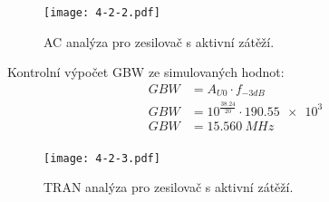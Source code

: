     \begin{figure}[h!]
        \centering
        \texttt{[image: 4-2-2.pdf]}
        \caption{AC analýza pro zesilovač s aktivní zátěží.}
        \label{fig:2-2-pdf}
    \end{figure}

    Kontrolní výpočet GBW ze simulovaných hodnot:
\begin{align*}
    GBW &= A_{U0}\cdot f_{-3dB} \\
    GBW &= 10^{\frac{\num{38.24}}{20}}\cdot \num{190.55e3} \\
    GBW &= \qty{15.560}{MHz} \\
\end{align*}

\begin{figure}[h!]
    \centering
    \texttt{[image: 4-2-3.pdf]}
    \caption{TRAN analýza pro zesilovač s aktivní zátěží.}
    \label{fig:2-2-pdf}
\end{figure}



